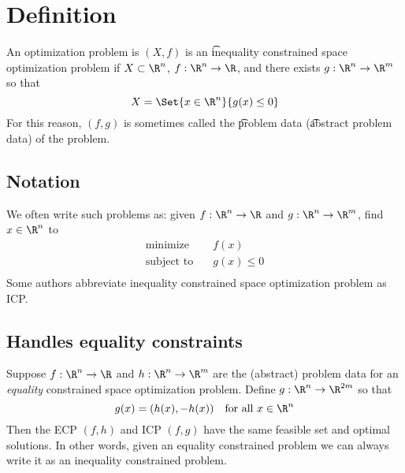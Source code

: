 
\section*{Definition}

An optimization problem is $(X, f)$ is an \t{inequality constrained space optimization problem} if $X \subset \R ^n$, $f: \R ^n \to \R $, and there exists $g: \R ^n \to \R ^m$ so that
\[
X = \Set{x \in \R ^n}{g(x) \leq 0}
\]
For this reason, $(f, g)$ is sometimes called the \t{problem data} (\t{abstract problem data}) of the problem.

\subsection*{Notation}

We often write such problems as: given $f: \R ^n \to \R $ and $g: \R ^n \to \R ^m$, find $x \in \R ^n$ to
\[
\begin{aligned}
\text{minimize} & \quad f(x) \\
\text{subject to} & \quad g(x) \leq 0 \\
\end{aligned}
\]
Some authors abbreviate inequality constrained space optimization problem as ICP.

\subsection*{Handles equality constraints}

Suppose $f: \R ^n \to \R $ and $h: \R ^n \to \R ^m$ are the (abstract) problem data for an \textit{equality} constrained space optimization problem.
Define $g: \R ^n \to \R ^{2m}$ so that
\[
g(x) = (h(x), -h(x)) \quad \text{for all } x \in \R ^n
\]
Then the ECP $(f, h)$ and ICP $(f, g)$ have the same feasible set and optimal solutions.
In other words, given an equality constrained problem we can always write it as an inequality constrained problem.

\blankpage